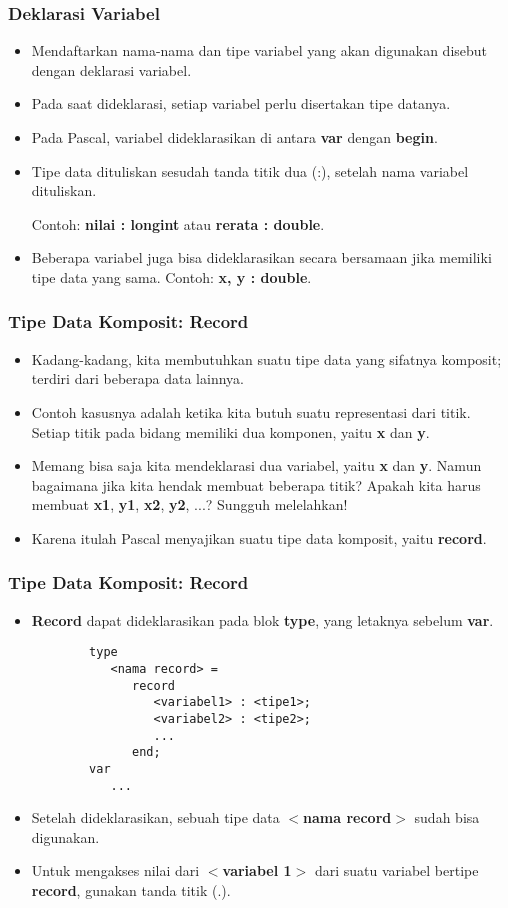 \documentclass{beamer}
\begin{document}
\begin{frame}
\frametitle{Deklarasi Variabel}
\begin{itemize}
    \item Mendaftarkan nama-nama dan tipe variabel yang akan digunakan disebut dengan deklarasi variabel.
    \item Pada saat dideklarasi, setiap variabel perlu disertakan tipe datanya.
    \item Pada Pascal, variabel dideklarasikan di antara \textbf{var} dengan \textbf{begin}.
    \item Tipe data dituliskan sesudah tanda titik dua (:), setelah nama variabel dituliskan.

    Contoh: \textbf{nilai : longint} atau \textbf{rerata : double}.
    \item Beberapa variabel juga bisa dideklarasikan secara bersamaan jika memiliki tipe data yang sama. Contoh: \textbf{x, y : double}.
\end{itemize}
\end{frame}

\begin{frame}
\frametitle{Tipe Data Komposit: Record}
\begin{itemize}
    \item Kadang-kadang, kita membutuhkan suatu tipe data yang sifatnya komposit; terdiri dari beberapa data lainnya.
    \item Contoh kasusnya adalah ketika kita butuh suatu representasi dari titik. Setiap titik pada bidang memiliki dua komponen, yaitu \textbf{x} dan \textbf{y}.
    \item Memang bisa saja kita mendeklarasi dua variabel, yaitu \textbf{x} dan \textbf{y}. Namun bagaimana jika kita hendak membuat beberapa titik? Apakah kita harus membuat \textbf{x1}, \textbf{y1}, \textbf{x2}, \textbf{y2}, ...? Sungguh melelahkan!
    \item Karena itulah Pascal menyajikan suatu tipe data komposit, yaitu \alert{\textbf{record}}.
\end{itemize}
\end{frame}

\begin{frame}[fragile]
\frametitle{Tipe Data Komposit: Record}
\begin{itemize}
    \item \textbf{Record} dapat dideklarasikan pada blok \textbf{type}, yang letaknya sebelum \textbf{var}.
    \begin{lstlisting}
        type
           <nama record> =
              record
                 <variabel1> : <tipe1>;
                 <variabel2> : <tipe2>;
                 ...
              end;
        var
           ...
    \end{lstlisting}
    \item Setelah dideklarasikan, sebuah tipe data \textbf{$<$nama record$>$} sudah bisa digunakan.
    \item Untuk mengakses nilai dari \textbf{$<$variabel 1$>$} dari suatu variabel bertipe \textbf{record}, gunakan tanda titik (.).
\end{itemize}
\end{frame}
\end{document}
